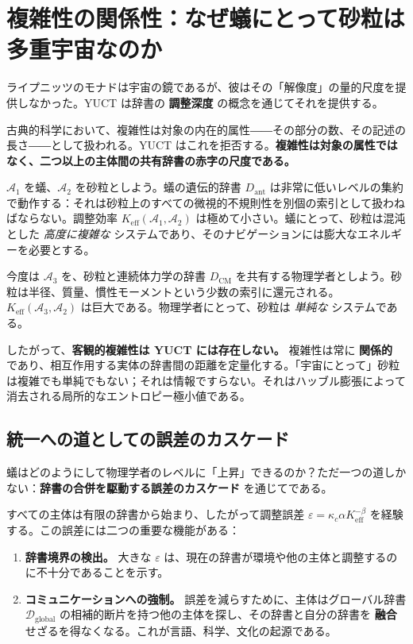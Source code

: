 \documentclass[12pt,a4paper]{article}
\newcommand{\Keff}{K_{\mathrm{eff}}}
\begin{document}
	\section{複雑性の関係性：なぜ蟻にとって砂粒は多重宇宙なのか}
	\label{sec:relational-complexity}
	
	ライプニッツのモナドは宇宙の鏡であるが、彼はその「解像度」の量的尺度を提供しなかった。YUCT は辞書の \textbf{調整深度} の概念を通じてそれを提供する。
	
	古典的科学において、複雑性は対象の内在的属性――その部分の数、その記述の長さ――として扱われる。YUCT はこれを拒否する。\textbf{複雑性は対象の属性ではなく、二つ以上の主体間の共有辞書の赤字の尺度である。}
	
	\(\mathcal{A}_1\) を蟻、\(\mathcal{A}_2\) を砂粒としよう。蟻の遺伝的辞書 \(D_{\text{ant}}\) は非常に低いレベルの集約で動作する：それは砂粒上のすべての微視的不規則性を別個の索引として扱わねばならない。調整効率 \(\Keff(\mathcal{A}_1, \mathcal{A}_2)\) は極めて小さい。蟻にとって、砂粒は混沌とした \emph{高度に複雑な} システムであり、そのナビゲーションには膨大なエネルギーを必要とする。
	
	今度は \(\mathcal{A}_3\) を、砂粒と連続体力学の辞書 \(D_{\text{CM}}\) を共有する物理学者としよう。砂粒は半径、質量、慣性モーメントという少数の索引に還元される。\(\Keff(\mathcal{A}_3, \mathcal{A}_2)\) は巨大である。物理学者にとって、砂粒は \emph{単純な} システムである。
	
	したがって、\textbf{客観的複雑性は YUCT には存在しない。} 複雑性は常に \textbf{関係的} であり、相互作用する実体の辞書間の距離を定量化する。「宇宙にとって」砂粒は複雑でも単純でもない；それは情報ですらない。それはハッブル膨張によって消去される局所的なエントロピー極小値である。
	
	\subsection{統一への道としての誤差のカスケード}
	\label{subsec:cascade}
	
	蟻はどのようにして物理学者のレベルに「上昇」できるのか？ただ一つの道しかない：\textbf{辞書の合併を駆動する誤差のカスケード} を通じてである。
	
	すべての主体は有限の辞書から始まり、したがって調整誤差 \(\varepsilon = \kappa_c \alpha \Keff^{-\beta}\) を経験する。この誤差には二つの重要な機能がある：
	
	\begin{enumerate}[leftmargin=*]
		\item \textbf{辞書境界の検出。} 大きな \(\varepsilon\) は、現在の辞書が環境や他の主体と調整するのに不十分であることを示す。
		\item \textbf{コミュニケーションへの強制。} 誤差を減らすために、主体はグローバル辞書 \(\mathcal{D}_{\text{global}}\) の相補的断片を持つ他の主体を探し、その辞書と自分の辞書を \textbf{融合} せざるを得なくなる。これが言語、科学、文化の起源である。
	\end{enumerate}
	
\end{document}
